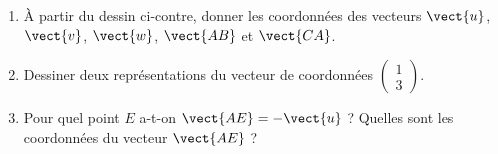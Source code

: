 
\begin{exercice}\label{exosmath-0103}

    \begin{center}
   
    \end{center}

        \begin{enumerate}
            \item
                À partir du dessin ci-contre, donner les coordonnées des vecteurs \( \vect{ u }\), \( \vect{ v }\), \( \vect{ w }\), \( \vect{ AB }\) et \( \vect{ CA }\).
            \item
                Dessiner deux représentations du vecteur de coordonnées \( \begin{pmatrix}
                    1    \\ 
                    3    
                \end{pmatrix}\).

            \item
                Pour quel point \( E\) a-t-on \( \vect{ AE }=-\vect{ u }\) ? Quelles sont les coordonnées du vecteur \( \vect{ AE }\) ?
             
        \end{enumerate}

\end{exercice}

